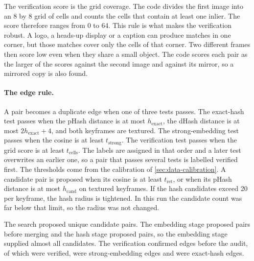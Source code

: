 The verification score is the grid coverage. The code divides the first image into an 8 by 8 grid of cells and counts the cells that contain at least one inlier. The score therefore ranges from 0 to 64. This rule is what makes the verification robust. A logo, a heads-up display or a caption can produce matches in one corner, but those matches cover only the cells of that corner. Two different frames then score low even when they share a small object. The code scores each pair as the larger of the scores against the second image and against its mirror, so a mirrored copy is also found.

\paragraph{The edge rule.} A pair becomes a duplicate edge when one of three tests passes. The exact-hash test passes when the pHash distance is at most $h_{\mathrm{exact}}$, the dHash distance is at most $2h_{\mathrm{exact}}+4$, and both keyframes are textured. The strong-embedding test passes when the cosine is at least $t_{\mathrm{strong}}$. The verification test passes when the grid score is at least $t_{\mathrm{cells}}$. The labels are assigned in that order and a later test overwrites an earlier one, so a pair that passes several tests is labelled verified first. The thresholds come from the calibration of \cref{sec:data-calibration}. A candidate pair is proposed when its cosine is at least $t_{\mathrm{ret}}$, or when its pHash distance is at most $h_{\mathrm{cand}}$ on textured keyframes. If the hash candidates exceed 20 per keyframe, the hash radius is tightened. In this run the candidate count was far below that limit, so the radius was not changed.

The search proposed  unique candidate pairs. The embedding stage proposed  pairs before merging and the hash stage proposed  pairs, so the embedding stage supplied almost all candidates. The verification confirmed  edges before the audit, of which  were verified,  were strong-embedding edges and  were exact-hash edges. \Preliminary

